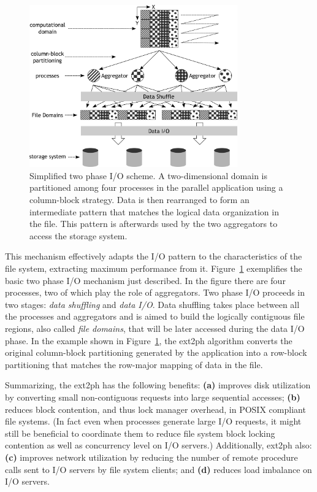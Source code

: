 \begin{figure}[!htb]
  \centering
  \includegraphics[width=0.8\textwidth]{figures/twophase}
  \caption{Simplified two phase I/O scheme. A two-dimensional domain is partitioned among four processes in the parallel application using a column-block strategy. Data is then rearranged to form an 
  intermediate pattern that matches the logical data organization in the file. This pattern is afterwards used by the two aggregators to access the storage system.}
  \label{figure: coll_io}
\end{figure}

This mechanism effectively adapts the I/O pattern to the characteristics of the file system, extracting maximum performance from it. Figure~\ref{figure: coll_io} exemplifies the basic two phase I/O 
mechanism just described. In the figure there are four processes, two of which play the role of aggregators. Two phase I/O proceeds in two stages: \textit{data shuffling} and \textit{data I/O}. Data 
shuffling takes place between all the processes and aggregators and is aimed to build the logically contiguous file regions, also called \textit{file domains}, that will be later accessed during the 
data I/O phase. In the example shown in Figure~\ref{figure: coll_io}, the ext2ph algorithm converts the original column-block partitioning generated by the application into a row-block partitioning that 
matches the row-major mapping of data in the file.

Summarizing, the ext2ph has the following benefits: \textbf{(a)} improves disk utilization by converting small non-contiguous requests into large sequential accesses; \textbf{(b)} reduces block 
contention, and thus lock manager overhead, in POSIX compliant file systems. (In fact even when processes generate large I/O requests, it might still be beneficial to coordinate them to reduce file system
block locking contention as well as concurrency level on I/O servers.) Additionally, ext2ph also: \textbf{(c)} improves network utilization by reducing the number of remote procedure calls sent to I/O 
servers by file system clients; and \textbf{(d)} reduces load imbalance on I/O servers.

